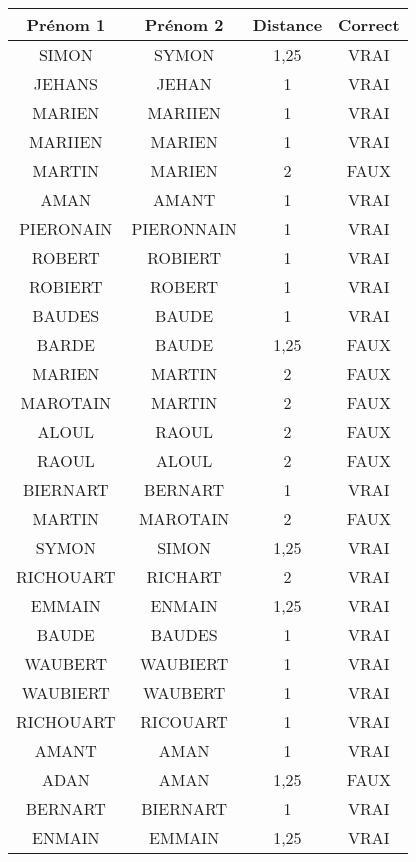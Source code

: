 \small
\begin{center}
    \begin{longtable}{|c|c|c|c|}
        \hline	Prénom 1	&	Prénom 2	&	Distance	&	Correct	\\
        \hline
        \hline	SIMON	&	SYMON	&	1,25	&	VRAI	\\
        \hline	JEHANS	&	JEHAN	&	1	&	VRAI	\\
        \hline	MARIEN	&	MARIIEN	&	1	&	VRAI	\\
        \hline	MARIIEN	&	MARIEN	&	1	&	VRAI	\\
        \hline	MARTIN	&	MARIEN	&	2	&	FAUX	\\
        \hline	AMAN	&	AMANT	&	1	&	VRAI	\\
        \hline	PIERONAIN	&	PIERONNAIN	&	1	&	VRAI	\\
        \hline	ROBERT	&	ROBIERT	&	1	&	VRAI	\\
        \hline	ROBIERT	&	ROBERT	&	1	&	VRAI	\\
        \hline	BAUDES	&	BAUDE	&	1	&	VRAI	\\
        \hline	BARDE	&	BAUDE	&	1,25	&	FAUX	\\
        \hline	MARIEN	&	MARTIN	&	2	&	FAUX	\\
        \hline	MAROTAIN	&	MARTIN	&	2	&	FAUX	\\
        \hline	ALOUL	&	RAOUL	&	2	&	FAUX	\\
        \hline	RAOUL	&	ALOUL	&	2	&	FAUX	\\
        \hline	BIERNART	&	BERNART	&	1	&	VRAI	\\
        \hline	MARTIN	&	MAROTAIN	&	2	&	FAUX	\\
        \hline	SYMON	&	SIMON	&	1,25	&	VRAI	\\
        \hline	RICHOUART	&	RICHART	&	2	&	VRAI	\\
        \hline	EMMAIN	&	ENMAIN	&	1,25	&	VRAI	\\
        \hline	BAUDE	&	BAUDES	&	1	&	VRAI	\\
        \hline	WAUBERT	&	WAUBIERT	&	1	&	VRAI	\\
        \hline	WAUBIERT	&	WAUBERT	&	1	&	VRAI	\\
        \hline	RICHOUART	&	RICOUART	&	1	&	VRAI	\\
        \hline	AMANT	&	AMAN	&	1	&	VRAI	\\
        \hline	ADAN	&	AMAN	&	1,25	&	FAUX	\\
        \hline	BERNART	&	BIERNART	&	1	&	VRAI	\\
        \hline	ENMAIN	&	EMMAIN	&	1,25	&	VRAI	\\

\end{longtable}
\end{center}

